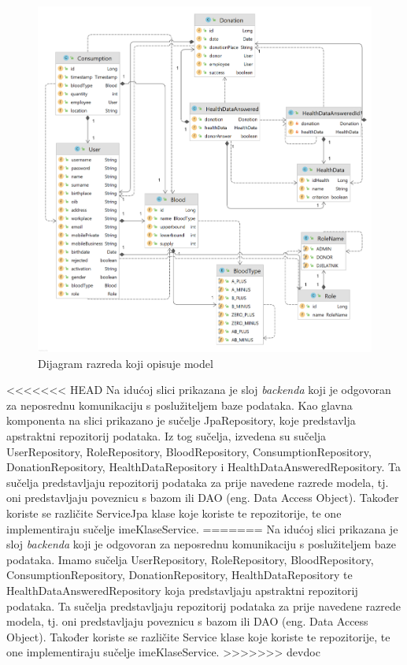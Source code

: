 \begin{figure}[H]
	\centering
	\includegraphics[width=\textwidth, scale=2.0]{dijagrami/dijagram_razreda1}
	\caption{Dijagram razreda koji opisuje model}
	\label{fig:dijagram_modela}
\end{figure}
		
	\eject
<<<<<<< HEAD
	Na idućoj slici prikazana je sloj \textit{backenda} koji je odgovoran za neposrednu komunikaciju s poslužiteljem baze podataka. Kao glavna komponenta na slici prikazano je sučelje JpaRepository, koje predstavlja apstraktni repozitorij podataka. Iz tog sučelja, izvedena su sučelja UserRepository, RoleRepository, BloodRepository, ConsumptionRepository, DonationRepository, HealthDataRepository i HealthDataAnsweredRepository. Ta sučelja predstavljaju repozitorij podataka za prije navedene razrede modela, tj. oni predstavljaju poveznicu s bazom ili DAO (eng. Data Access Object). Također koriste se različite ServiceJpa klase koje koriste te repozitorije, te one implementiraju sučelje imeKlaseService. 
=======
	Na idućoj slici prikazana je sloj \textit{backenda} koji je odgovoran za neposrednu komunikaciju s poslužiteljem baze podataka. Imamo sučelja UserRepository, RoleRepository, BloodRepository, ConsumptionRepository, DonationRepository, HealthDataRepository te HealthDataAnsweredRepository koja predstavljaju apstraktni repozitorij podataka. Ta sučelja predstavljaju repozitorij podataka za prije navedene razrede modela, tj. oni predstavljaju poveznicu s bazom ili DAO (eng. Data Access Object). Također koriste se različite Service klase koje koriste te repozitorije, te one implementiraju sučelje imeKlaseService.  
>>>>>>> devdoc
	
